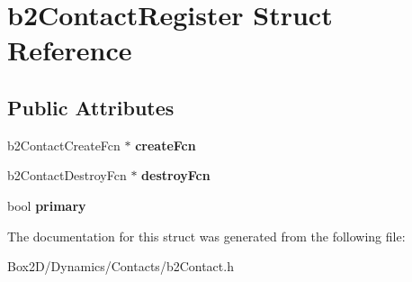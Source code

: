 \hypertarget{structb2_contact_register}{}\section{b2\+Contact\+Register Struct Reference}
\label{structb2_contact_register}
\subsection*{Public Attributes}
\begin{DoxyCompactItemize}
\item 
\mbox{\label{structb2_contact_register_ae065de11ab2f164bd1b8e3a461b41824}} 
b2\+Contact\+Create\+Fcn $\ast$ {\bfseries create\+Fcn}
\item 
\mbox{\label{structb2_contact_register_a95862aec746f5fd6ffa00a6729dec61f}} 
b2\+Contact\+Destroy\+Fcn $\ast$ {\bfseries destroy\+Fcn}
\item 
\mbox{\label{structb2_contact_register_a43f2d79909505b785b9034b21a56525e}} 
bool {\bfseries primary}
\end{DoxyCompactItemize}


The documentation for this struct was generated from the following file\+:\begin{DoxyCompactItemize}
\item 
Box2\+D/\+Dynamics/\+Contacts/b2\+Contact.\+h\end{DoxyCompactItemize}
